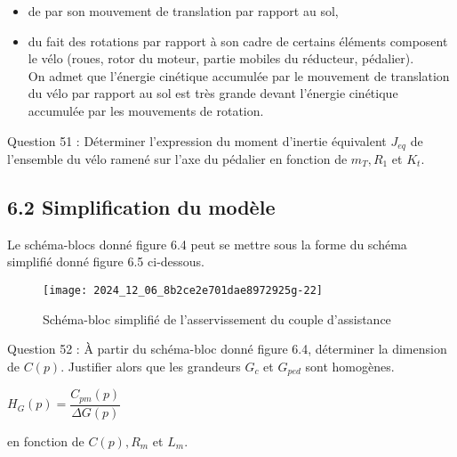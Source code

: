\begin{itemize}
  \item de par son mouvement de translation par rapport au sol,
  \item du fait des rotations par rapport à son cadre de certains éléments composent le vélo (roues, rotor du moteur, partie mobiles du réducteur, pédalier).\\
On admet que l'énergie cinétique accumulée par le mouvement de translation du vélo par rapport au sol est très grande devant l'énergie cinétique accumulée par les mouvements de rotation.
\end{itemize}

Question 51 : Déterminer l'expression du moment d'inertie équivalent \(J_{e q}\) de l'ensemble du vélo ramené sur l'axe du pédalier en fonction de \(m_{T}, R_{1}\) et \(K_{t}\).

\subsection{6.2 Simplification du modèle}
Le schéma-blocs donné figure 6.4 peut se mettre sous la forme du schéma simplifié donné figure 6.5 ci-dessous.\\

\begin{figure}[!htb]
\begin{center}
\texttt{[image: 2024\_12\_06\_8b2ce2e701dae8972925g-22]}
\caption{Schéma-bloc simplifié de l'asservissement du couple d'assistance \label{fig18}}
\end{center}
\end{figure}

Question 52 : À partir du schéma-bloc donné figure 6.4, déterminer la dimension de \(C(p)\). Justifier alors que les grandeurs \(G_{c}\) et \(G_{p e d}\) sont homogènes.

\fi
{}

\ifprof
\begin{corrige}

\end{corrige}

\else
$
H_{G}(p)=\dfrac{C_{p m}(p)}{\Delta G(p)}
$

en fonction de \(C(p), R_{m}\) et \(L_{m}\).

\fi
{}

\ifprof
\begin{corrige}

\end{corrige}

